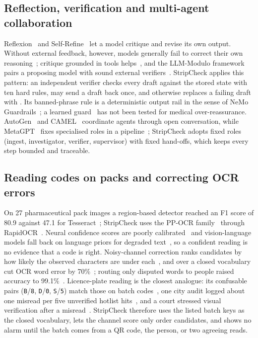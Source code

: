 \subsection{Reflection, verification and multi-agent collaboration}
Reflexion~\cite{shinn2023reflexion} and Self-Refine~\cite{madaan2023selfrefine} let a model critique and revise its own output. Without external feedback, however, models generally fail to correct their own reasoning~\cite{huang2024cannot}; critique grounded in tools helps~\cite{gou2024critic}, and the LLM-Modulo framework pairs a proposing model with sound external verifiers~\cite{kambhampati2024llmmodulo}. StripCheck applies this pattern: an independent verifier checks every draft against the stored state with ten hard rules, may send a draft back once, and otherwise replaces a failing draft with \CANTV{}. Its banned-phrase rule is a deterministic output rail in the sense of NeMo Guardrails~\cite{rebedea2023nemo}; a learned guard~\cite{inan2023llamaguard} has not been tested for medical over-reassurance. AutoGen~\cite{wu2023autogen} and CAMEL~\cite{li2023camel} coordinate agents through open conversation, while MetaGPT~\cite{hong2023metagpt} fixes specialised roles in a pipeline~\cite{wang2023survey,xi2023rise}; StripCheck adopts fixed roles (ingest, investigator, verifier, supervisor) with fixed hand-offs, which keeps every step bounded and traceable.

\subsection{Reading codes on packs and correcting OCR errors}
On 27 pharmaceutical pack images a region-based detector reached an F1 score of 80.9 against 47.1 for Tesseract~\cite{koponen2024novel}; StripCheck uses the PP-OCR family~\cite{du2020ppocr,li2022ppocrv3} through RapidOCR~\cite{rapidai2021rapidocr}. Neural confidence scores are poorly calibrated~\cite{guo2017calibration} and vision-language models fall back on language priors for degraded text~\cite{he2025seeing}, so a confident reading is no evidence that a code is right. Noisy-channel correction ranks candidates by how likely the observed characters are under each~\cite{kernighan1990spelling,brill2000improved}, and over a closed vocabulary cut OCR word error by 70\%~\cite{kolak2003generative}; routing only disputed words to people raised accuracy to 99.1\%~\cite{vonahn2008recaptcha}. Licence-plate reading is the closest analogue: its confusable pairs (\texttt{B}/\texttt{8}, \texttt{D}/\texttt{0}, \texttt{S}/\texttt{5}) match those on batch codes~\cite{laroca2021efficient}, one city audit logged about one misread per five unverified hotlist hits~\cite{seattleoig2023alpr}, and a court stressed visual verification after a misread~\cite{green2014ninth}. StripCheck therefore uses the listed batch keys as the closed vocabulary, lets the channel score only order candidates, and shows no alarm until the batch comes from a QR code, the person, or two agreeing reads.

